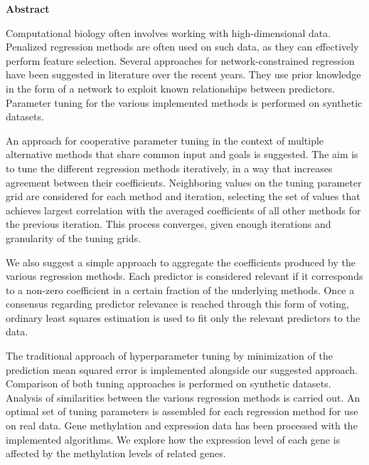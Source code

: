 \newpage
{\Huge \bf Abstract}
\vspace{24pt} 

Computational biology often involves working with high-dimensional data. Penalized regression methods are often used on such data, as they can effectively perform feature selection. Several approaches for network-constrained regression have been suggested in literature over the recent years. They use prior knowledge in the form of a network to exploit known relationships between predictors. Parameter tuning for the various implemented methods is performed on synthetic datasets. 

An approach for cooperative parameter tuning in the context of multiple alternative methods that share common input and goals is suggested. The aim is to tune the different regression methods iteratively, in a way that increases agreement between their coefficients. Neighboring values on the tuning parameter grid are considered for each method and iteration, selecting the set of values that achieves largest correlation with the averaged coefficients of all other methods for the previous iteration. This process converges, given enough iterations and granularity of the tuning grids.

We also suggest a simple approach to aggregate the coefficients produced by the various regression methods. Each predictor is considered relevant if it corresponds to a non-zero coefficient in a certain fraction of the underlying methods. Once a consensus regarding predictor relevance is reached through this form of voting, ordinary least squares estimation is used to fit only the relevant predictors to the data.

The traditional approach of hyperparameter tuning by minimization of the prediction mean squared error is implemented alongside our suggested approach. Comparison of both tuning approaches is performed on synthetic datasets. Analysis of similarities between the various regression methods is carried out. An optimal set of tuning parameters is assembled for each regression method for use on real data. Gene methylation and expression data has been processed with the implemented algorithms. We explore how the expression level of each gene is affected by the methylation levels of related genes.

\newpage
\vspace*{\fill}
